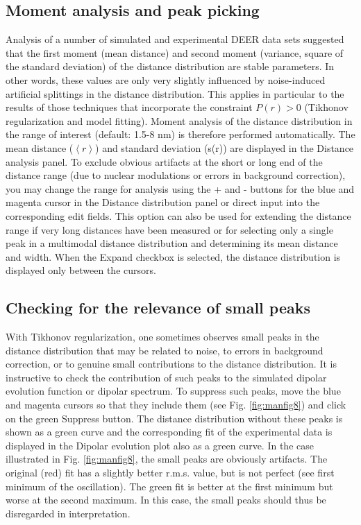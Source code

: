 \documentclass{article}
\begin{document}
\subsection{Moment analysis and peak picking}
Analysis of a number of simulated and experimental DEER data sets suggested
that the first moment (mean distance) and second moment (variance, square of
the standard deviation) of the distance distribution are stable parameters. In
other words, these values are only very slightly influenced by noise-induced artificial splittings in the distance distribution. This applies
in particular to the results of those techniques that incorporate the constraint
$P(r) > 0$ (Tikhonov regularization and model fitting). Moment analysis of the distance distribution in the range of interest (default: 1.5-8 nm) is therefore performed automatically. The mean distance ($\left\langle r \right\rangle$) and standard deviation (s(r)) are displayed in the {\ttfamily Distance analysis} panel. To exclude obvious artifacts
at the short or long end of the distance range (due to nuclear modulations or
errors in background correction), you may change the range for analysis using
the {\ttfamily +} and {\ttfamily -} buttons for the blue and magenta cursor in the {\ttfamily Distance distribution} panel or direct input into the corresponding edit fields. This option can also be used for extending the distance range if very long distances have been measured or for selecting only a single peak in a multimodal distance distribution and determining its mean distance and width.  When the {\ttfamily Expand} checkbox is selected, the distance distribution is displayed only between the cursors. 

\subsection{Checking for the relevance of small peaks}
With Tikhonov regularization, one sometimes observes small peaks in the distance distribution that may be related to noise, to errors in background correction, or to genuine small contributions to the distance distribution. It is instructive to check the contribution of such peaks to the simulated dipolar evolution function or dipolar spectrum. To suppress such peaks, move the blue and magenta cursors so that they include them (see Fig. \ref{fig:manfig8}) and click on the green {\ttfamily Suppress} button. The distance distribution without these peaks is shown as a green curve and the corresponding fit of the experimental data is displayed in the {\ttfamily Dipolar evolution} plot also as a green curve. In the case illustrated in Fig. \ref{fig:manfig8}, the small peaks are obviously artifacts. The original (red) fit has a slightly better r.m.s. value, but is not perfect (see first minimum of the oscillation). The green fit is better at the first minimum but worse at the second maximum. In this case, the small peaks should thus be disregarded in interpretation.
\end{document}
